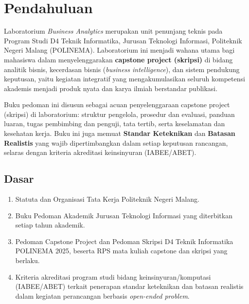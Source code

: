 \documentclass[12pt,a4paper]{report}
\begin{document}
\PedomanCover

\clearpage
\tableofcontents

\clearpage
{}

\chapter{Pendahuluan}

Laboratorium \emph{Business Analytics} merupakan unit penunjang teknis pada Program Studi D4 Teknik Informatika, Jurusan Teknologi Informasi, Politeknik Negeri Malang (POLINEMA). Laboratorium ini menjadi wahana utama bagi mahasiswa dalam menyelenggarakan \textbf{capstone project (skripsi)} di bidang analitik bisnis, kecerdasan bisnis (\emph{business intelligence}), dan sistem pendukung keputusan, yaitu kegiatan integratif yang mengakumulasikan seluruh kompetensi akademis menjadi produk nyata dan karya ilmiah berstandar publikasi.

Buku pedoman ini disusun sebagai acuan penyelenggaraan capstone project (skripsi) di laboratorium: struktur pengelola, prosedur dan evaluasi, panduan luaran, tugas pembimbing dan penguji, tata tertib, serta keselamatan dan kesehatan kerja. Buku ini juga memuat \textbf{Standar Keteknikan} dan \textbf{Batasan Realistis} yang wajib dipertimbangkan dalam setiap keputusan rancangan, selaras dengan kriteria akreditasi keinsinyuran (IABEE/ABET).

\section{Dasar}
\begin{enumerate}
\item Statuta dan Organisasi Tata Kerja Politeknik Negeri Malang.
\item Buku Pedoman Akademik Jurusan Teknologi Informasi yang diterbitkan setiap tahun akademik.
\item Pedoman Capstone Project dan Pedoman Skripsi D4 Teknik Informatika POLINEMA 2025, beserta RPS mata kuliah capstone dan skripsi yang berlaku.
\item Kriteria akreditasi program studi bidang keinsinyuran/komputasi (IABEE/ABET) terkait penerapan standar keteknikan dan batasan realistis dalam kegiatan perancangan berbasis \emph{open-ended problem}.
\end{enumerate}
\end{document}
